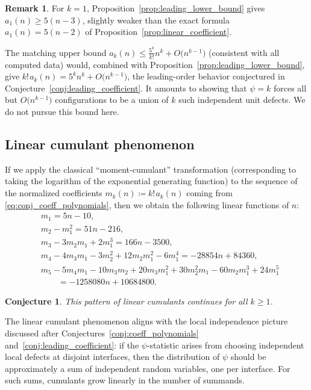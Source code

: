 \documentclass[10pt,a4paper]{amsart}
\numberwithin{equation}{section}
\newcommand{\ssp}{\hspace{1pt}}
\newtheorem{Conjecture}[Theorem]{Conjecture}
\theoremstyle{definition}
\newtheorem{Remark}[Theorem]{Remark}
\begin{document}
\begin{Remark}
	\label{rem:leading_lower_bound}
	For $k=1$,
	Proposition~\ref{prop:leading_lower_bound}
	gives $a_1(n)\ge 5(n-3)$, slightly
	weaker than the exact formula $a_1(n)=5(n-2)$ of Proposition~\ref{prop:linear_coefficient}.

	The matching upper bound $a_k(n)\le\frac{5^k}{k!}n^k+O\bigl(n^{k-1}\bigr)$
	(consistent with all computed data) would, combined with
	Proposition~\ref{prop:leading_lower_bound}, give
	$k!\ssp a_k(n)=5^{k}n^{k}+O\bigl(n^{k-1}\bigr)$, the leading-order behavior
	conjectured in Conjecture~\ref{conj:leading_coefficient}. It amounts to showing that
	$\psi=k$ forces all but $O\bigl(n^{k-1}\bigr)$ configurations to be a union of $k$
	such independent unit defects.
	We do not pursue this bound here.
\end{Remark}

\subsection{Linear cumulant phenomenon}
\label{subsec:linear_cumulant_phenomenon}

If we apply the classical ``moment-cumulant'' transformation (corresponding to
taking the logarithm of the exponential generating function) to the sequence of
the normalized coefficients $m_k(n)\coloneqq k!\ssp a_k(n)$ coming from
\eqref{eq:conj_coeff_polynomials}, then we obtain the following linear functions
of $n$:
\begin{equation*}
	\begin{split}
		&m_1=5n-10,\\
		&m_2-m_1^2=51n-216,\\
		&m_3-3m_2m_1+2m_1^3
=166n-3500,\\
		&m_4 -4m_3m_1-3m_2^2+12m_2m_1^2-6m_1^4
=-28854n+84360,\\
		&m_5 -5m_4m_1-10m_3m_2+ 20m_3m_1^2+30m_2^2m_1-60m_2m_1^3+24m_1^5\\
&\qquad = -
		1258080 n +10684800 .
	\end{split}
\end{equation*}

\begin{Conjecture}
	\label{conj:linear_cumulants}
	This pattern of linear cumulants continues for all $k\ge1$.
\end{Conjecture}

The linear cumulant phenomenon aligns with the local independence picture
discussed after Conjectures~\ref{conj:coeff_polynomials} and~\ref{conj:leading_coefficient}: if the
$\psi$-statistic arises from choosing independent local defects at disjoint
interfaces, then the distribution of $\psi$ should be approximately a sum of
independent random variables, one per interface.
For such sums, cumulants grow linearly in the number of summands.
\end{document}
